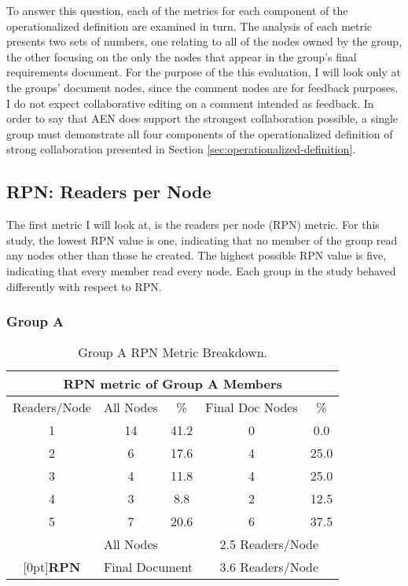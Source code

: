 To answer this question, each of the metrics for each component of the
operationalized definition are examined in turn.  The analysis of each
metric presents two sets of numbers, one relating to all of the nodes owned
by the group, the other focusing on the only the nodes that appear in the
group's final requirements document.  For the purpose of the this
evaluation, I will look only at the groups' document nodes, since the
comment nodes are for feedback purposes.  I do not expect collaborative
editing on a comment intended as feedback.  In order to say that AEN does
support the strongest collaboration possible, a single group must
demonstrate all four components of the operationalized definition of strong
collaboration presented in Section \ref{sec:operationalized-definition}.

\subsection{RPN: Readers per Node}

The first metric I will look at, is the readers per node (RPN) metric. For
this study, the lowest RPN value is one, indicating that no member of the
group read any nodes other than those he created.  The highest possible RPN
value is five, indicating that every member read every node.  Each group
in the study behaved differently with respect to RPN.

\subsubsection{Group A}

\small
\begin{table}[htb]
  \caption{Group A RPN Metric Breakdown.}
  \begin{center}
    \begin{tabular}{|c|c|c|c|c|}
      \hline
      \multicolumn{5}{|c|}{\rule[-3mm]{0mm}{8mm}\bf RPN metric of Group A
      Members}\\ \hline 
      Readers/Node&All Nodes&{\%}&Final Doc Nodes&{\%}\\ \hline 
      \hline
      1&14&41.2&0&0.0\\ \hline
      2&6&17.6&4&25.0\\ \hline
      3&4&11.8&4&25.0\\ \hline
      4&3&8.8&2&12.5\\\hline 
      5&7&20.6&6&37.5\\\hline 
      \hline
      &\multicolumn{2}{|l|}{All Nodes}&\multicolumn{2}{|c|}{2.5
      Readers/Node}\\ \cline{2-5} 
      \raisebox{1.5ex}[0pt]{\bf RPN}&\multicolumn{2}{|l|}{Final
      Document}&\multicolumn{2}{|c|}{3.6 Readers/Node}\\\hline
    \end{tabular}
  \end{center}
  \label{tab:A-reading}
\end{table}
\normalsize

